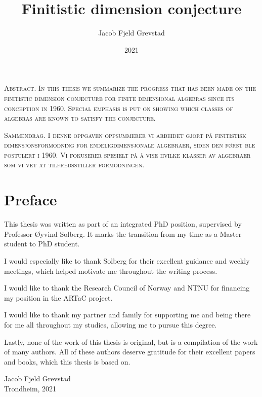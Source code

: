 \documentclass[11pt, english, twoside]{article}
\theoremstyle{definition}
\begin{document}
\title{Finitistic dimension conjecture}
\author{Jacob Fjeld Grevstad}
\date{2021}
{}

%
\noindent \scshape\mdseries Abstract. \normalfont
In this thesis we summarize the progress that has been made on the finitistic dimension conjecture for finite dimensional algebras since its conception in 1960. Special emphasis is put on showing which classes of algebras are known to satisfy the conjecture.

\noindent \scshape\mdseries Sammendrag. \normalfont
I denne oppgaven oppsummerer vi arbeidet gjort på finitistisk dimensjonsformodning for endeligdimensjonale algebraer, siden den først ble postulert i 1960. Vi fokuserer spesielt på å vise hvilke klasser av algebraer som vi vet at tilfredsstiller formodningen.
\clearpage

\section*{Preface}
%
This thesis was written as part of an integrated PhD position, supervised by Professor Øyvind Solberg. It marks the transition from my time as a Master student to PhD student.

I would especially like to thank Solberg for their excellent guidance and weekly meetings, which helped motivate me throughout the writing process. 

I would like to thank the Research Council of Norway and NTNU for financing my position in the ARTaC project.

I would like to thank my partner and family for supporting me and being there for me all throughout my studies, allowing me to pursue this degree. 

Lastly, none of the work of this thesis is original, but is a compilation of the work of many authors. All of these authors deserve gratitude for their excellent papers and books, which this thesis is based on. 
\begin{flushright}
	Jacob Fjeld Grevstad\\ 
	Trondheim, 2021
\end{flushright}
\clearpage

\tableofcontents
\clearpage
\end{document}
